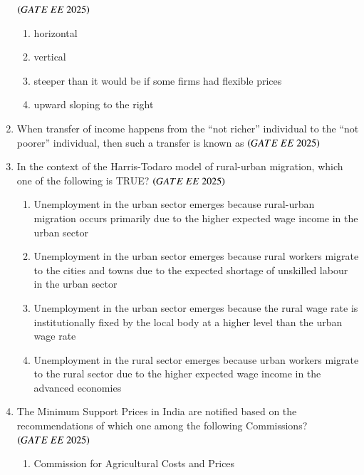 \documentclass[journal,12pt,onecolumn]{IEEEtran}
\theoremstyle{remark}
\begin{document}
\begin{enumerate}
     \hfill $\brak{GATE\ EE\ 2025}$
    \begin{enumerate}
        \item horizontal
        \item vertical
        \item steeper than it would be if some firms had flexible prices
        \item upward sloping to the right
  \end{enumerate}
\item When transfer of income happens from the ``not richer'' individual to the ``not poorer'' individual, then such a transfer is known as
\hfill $\brak{GATE\ EE\ 2025}$
    \begin{enumerate}
      \end{enumerate}
\item In the context of the Harris-Todaro model of rural-urban migration, which one of the following is TRUE?
\hfill $\brak{GATE\ EE\ 2025}$
    \begin{enumerate}
    \item Unemployment in the urban sector emerges because rural-urban migration occurs primarily due to the higher expected wage income in the urban sector
    \item Unemployment in the urban sector emerges because rural workers migrate to the cities and towns due to the expected shortage of unskilled labour in the urban sector
    \item Unemployment in the urban sector emerges because the rural wage rate is institutionally fixed by the local body at a higher level than the urban wage rate
    \item Unemployment in the rural sector emerges because urban workers migrate to the rural sector due to the higher expected wage income in the advanced economies
  \end{enumerate}
\item The Minimum Support Prices in India are notified based on the recommendations of which one among the following Commissions?
\hfill $\brak{GATE\ EE\ 2025}$
    \begin{enumerate}
    \item Commission for Agricultural Costs and Prices

\end{enumerate}
\end{enumerate}
\end{document}
